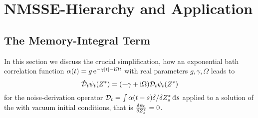 \chapter{NMSSE-Hierarchy and Application}
\label{cha:hierarchy}

\section{The Memory-Integral Term}
\label{sec:hierarchy.memory_integral}

In this section we discuss the crucial simplification, how an exponential bath correlation function $\alpha(t) = g\,\exp[-\gamma\abs{t}-\ii\Omega t]$ with real parameters $g,\gamma,\Omega$ leads to
\begin{equation}
  \dot\adjZZ_t\psitZ = (-\gamma + \ii\Omega) \adjZZ_t\psitZ
  \label{eq:memint.adjzzt_deriv}
\end{equation}
for the noise-derivation operator $\mathcal{D}_t = \int\alpha(t-s)\delta/\delta {Z}^*_s \, \mathrm{d} s$ applied to a solution of the \NMSSE with vacuum initial conditions, that is $\frac{\delta\psi_0}{\delta {Z}^*_s} = 0$.

